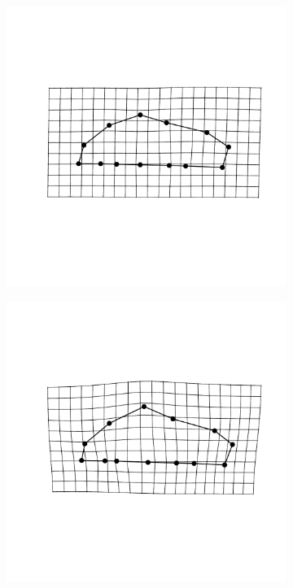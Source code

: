 \documentclass[12pt]{article}\usepackage{graphicx, color}
\begin{document}
\begin{figure}[ht]
  \centering
  \begin{subfigure}[b]{0.4\textwidth}
    \centering
    \includegraphics[width = \textwidth]{figure/mshape_1}
    \label{fig:mean_shape1}
  \end{subfigure}
  \begin{subfigure}[b]{0.4\textwidth}
    \centering
    \includegraphics[width = \textwidth]{figure/mshape_2}
    \label{fig:mean_shape2}
  \end{subfigure}


\end{figure}
\end{document}
